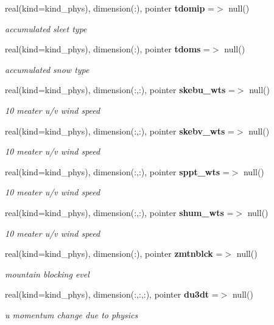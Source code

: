 \begin{DoxyCompactItemize}
real(kind=kind\+\_\+phys), dimension(\+:), pointer \textbf{ tdomip} =$>$ null()
\begin{DoxyCompactList}\small\item\em accumulated sleet type \end{DoxyCompactList}\item 
real(kind=kind\+\_\+phys), dimension(\+:), pointer \textbf{ tdoms} =$>$ null()
\begin{DoxyCompactList}\small\item\em accumulated snow type \end{DoxyCompactList}\item 
real(kind=kind\+\_\+phys), dimension(\+:,\+:), pointer \textbf{ skebu\+\_\+wts} =$>$ null()
\begin{DoxyCompactList}\small\item\em 10 meater u/v wind speed \end{DoxyCompactList}\item 
real(kind=kind\+\_\+phys), dimension(\+:,\+:), pointer \textbf{ skebv\+\_\+wts} =$>$ null()
\begin{DoxyCompactList}\small\item\em 10 meater u/v wind speed \end{DoxyCompactList}\item 
real(kind=kind\+\_\+phys), dimension(\+:,\+:), pointer \textbf{ sppt\+\_\+wts} =$>$ null()
\begin{DoxyCompactList}\small\item\em 10 meater u/v wind speed \end{DoxyCompactList}\item 
real(kind=kind\+\_\+phys), dimension(\+:,\+:), pointer \textbf{ shum\+\_\+wts} =$>$ null()
\begin{DoxyCompactList}\small\item\em 10 meater u/v wind speed \end{DoxyCompactList}\item 
real(kind=kind\+\_\+phys), dimension(\+:), pointer \textbf{ zmtnblck} =$>$ null()
\begin{DoxyCompactList}\small\item\em mountain blocking evel \end{DoxyCompactList}\item 
real(kind=kind\+\_\+phys), dimension(\+:,\+:,\+:), pointer \textbf{ du3dt} =$>$ null()
\begin{DoxyCompactList}\small\item\em u momentum change due to physics \end{DoxyCompactList}\item 

\end{DoxyCompactItemize}
